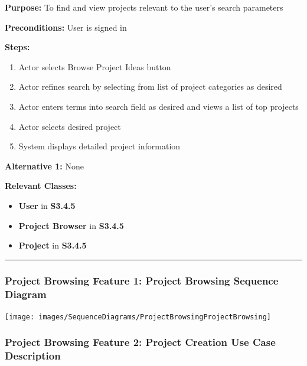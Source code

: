 \documentclass[twoside,letterpaper]{article}
\begin{document}
\noindent\textbf{Purpose:} To find and view projects relevant to the user's search parameters \newline

\noindent\textbf{Preconditions:} User is signed in \newline

\noindent\textbf{Steps:} \begin{enumerate}
	\item Actor selects Browse Project Ideas button
	\item Actor refines search by selecting from list of project categories as desired
	\item Actor enters terms into search field as desired and views a list of top projects
	\item Actor selects desired project
	\item System displays detailed project information
\end{enumerate}
\noindent\textbf{Alternative 1:} None \newline


\noindent\textbf{Relevant Classes:}
\begin{itemize}
	\item \textbf{User} in \textbf{S3.4.5}
	\item \textbf{Project Browser} in \textbf{S3.4.5}
	\item \textbf{Project} in \textbf{S3.4.5}
\end{itemize}
\vspace{8pt}
\hrule
\newpage
\subsubsection[Project Browsing Feature 1: Project Browsing Sequence Diagram]{\rmfamily\bfseries\color{black}
	Project Browsing Feature 1: Project Browsing Sequence Diagram}
\hypertarget{RefHeading22059017292}{}

\bigskip

\texttt{[image: images/SequenceDiagrams/ProjectBrowsingProjectBrowsing]}

\newpage
\subsubsection[Project Browsing Feature 2: Project Creation Use Case Description]{\rmfamily\bfseries\color{black}
Project Browsing Feature 2: Project Creation Use Case Description}
\hypertarget{RefHeading22059017292}{}
\end{document}
